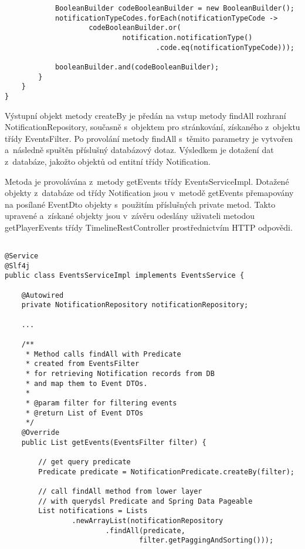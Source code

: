 \documentclass[twoside, 12pt]{article}
\begin{document}
{\begin{lstlisting}
            BooleanBuilder codeBooleanBuilder = new BooleanBuilder();
            notificationTypeCodes.forEach(notificationTypeCode ->
                    codeBooleanBuilder.or(
                            notification.notificationType()
                                    .code.eq(notificationTypeCode)));

            booleanBuilder.and(codeBooleanBuilder);
        }
    }
}
\end{lstlisting}

Výstupní objekt metody createBy je předán na vstup metody findAll rozhraní NotificationRepository,
současně s~objektem pro stránkování, získaného z~objektu třídy EventsFilter.
Po provolání metody findAll s~těmito parametry je vytvořen a~následně spuštěn příslušný databázový dotaz.
Výsledkem je dotažení dat z~databáze, jakožto objektů od entitní třídy Notification.

Metoda je provolávána z~metody getEvents třídy EventsServiceImpl.
Dotažené objekty z~databáze od třídy Notification jsou v~metodě getEvents
přemapovány na posílané EventDto objekty s~použitím příslušných private metod.
Takto upravené a~získané objekty jsou v~závěru odeslány uživateli metodou getPlayerEvents
třídy TimelineRestController prostřednictvím HTTP odpovědi.


\clearpage

\begin{lstlisting}

@Service
@Slf4j
public class EventsServiceImpl implements EventsService {

    @Autowired
    private NotificationRepository notificationRepository;

    ...

    /**
     * Method calls findAll with Predicate
     * created from EventsFilter
     * for retrieving Notification records from DB
     * and map them to Event DTOs.
     *
     * @param filter for filtering events
     * @return List of Event DTOs
     */
    @Override
    public List getEvents(EventsFilter filter) {

        // get query predicate
        Predicate predicate = NotificationPredicate.createBy(filter);

        // call findAll method from lower layer
        // with querydsl Predicate and Spring Data Pageable
        List notifications = Lists
                .newArrayList(notificationRepository
                        .findAll(predicate,
                                filter.getPaggingAndSorting()));


\end{lstlisting}}
\end{document}
